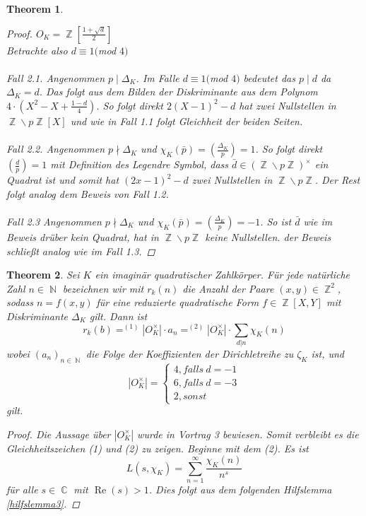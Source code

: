 \documentclass[10pt,a4paper]{article}
\theoremstyle{plain}
\newtheorem{thm}{Theorem}[section]
\theoremstyle{definition}
\theoremstyle{remark}
\DeclareMathOperator{\C}{\mathbb{C}}
\DeclareMathOperator{\Z}{\mathbb{Z}}
\DeclareMathOperator{\N}{\mathbb{N}}
\DeclareMathOperator{\re}{Re}
\begin{document}
\begin{thm}
\begin{proof}
$O_K= \Z[\frac{1+\sqrt{d}}{2}]$ \\
Betrachte also $d\equiv 1 ($mod $ 4)$ 
\\
\\
\textit{Fall 2.1.}
Angenommen $p \mid \Delta_K$. Im Falle $d\equiv 1 ($mod $ 4)$ bedeutet das $p\mid d$ da  $\Delta_K=d$. Das folgt aus dem Bilden der Diskriminante aus dem Polynom $4\cdot(X^2-X+\frac{1-d}{4})$. So folgt direkt $2(X-1)^{2}-d$ hat zwei Nullstellen in $\Z\backslash p\Z[X]$ und wie in Fall 1.1 folgt Gleichheit der beiden Seiten.
\\
\\
\textit{Fall 2.2.}
Angenommen $p\nmid \Delta_K$ und $\chi_K(\bar{p})=(\frac{\Delta_K}{p})=1$. So folgt direkt $(\frac{d}{p})=1$ mit Definition des Legendre Symbol, dass $\bar{d} \in (\Z\backslash p\Z)^\times$ ein Quadrat ist und somit hat $(2x-1)^2-d$ zwei Nullstellen in $\Z\backslash p\Z$. Der Rest folgt analog dem Beweis von Fall 1.2.
\\
\\
\textit{Fall 2.3}
Angenommen $p\nmid \Delta_K$ und $\chi_K(\bar{p})=(\frac{\Delta_K}{p})=-1$. So ist $\bar{d}$ wie im Beweis drüber kein Quadrat, hat in $\Z\backslash p\Z$ keine Nullstellen. der Beweis schließt analog wie im Fall 1.3.


\end{proof}
\end{thm}

\begin{thm}

Sei $\textit{K}$ ein imaginär quadratischer Zahlkörper. Für jede natürliche Zahl $n \in \N$ bezeichnen wir mit $r_k(n)$ die Anzahl der Paare $(x,y) \in \Z^2$, sodass $n = f(x,y)$ für eine reduzierte quadratische Form $f \in \Z[X,Y]$ mit Diskriminante $\Delta_K$ gilt. Dann ist $$r_k(b) =^{(1)} |O_K^\times|\cdot a_n =^{(2)} |O_K^\times|\cdot \sum_{d|n}\chi_K(n)$$wobei $(a_n)_{n \in \N}$ die Folge der Koeffizienten der Dirichletreihe zu $\zeta_K$ ist, und $$|O_K^\times|=\begin{cases}4, falls \ d = -1\\6, falls \ d = -3\\2, sonst\end{cases}$$ gilt.
\\
\begin{proof}
Die Aussage über $|O_K^\times|$ wurde in Vortrag 3 bewiesen. Somit verbleibt es die Gleichheitszeichen (1) und (2) zu zeigen. Beginne mit dem (2). Es ist $$L(s,\chi_K)=\sum_{n=1}^{\infty}\frac{\chi_K(n)}{n^s}$$ für alle $s \in \C $ mit $ \re(s) > 1$. Dies folgt aus dem folgenden Hilfslemma \ref{hilfslemma3}.
 
 \end{proof}
 \end{thm}
 
\end{document}
